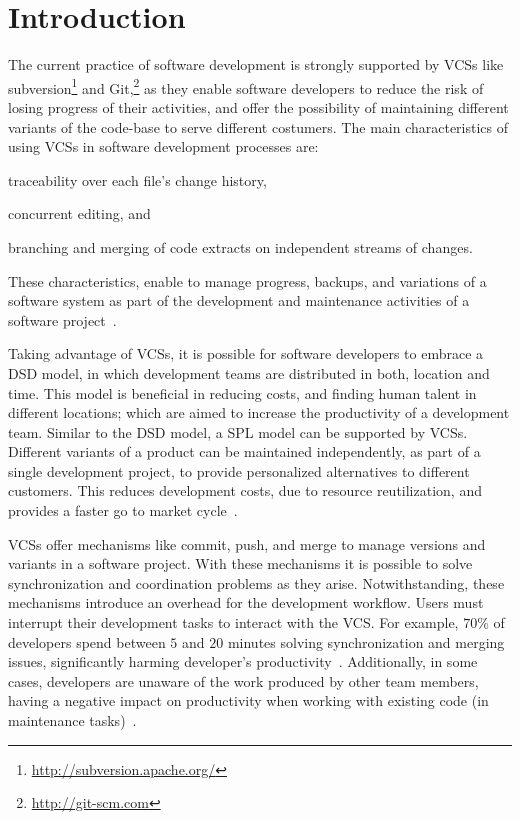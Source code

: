 
\section{Introduction}
\label{sec:introduction}

The current practice of software development is strongly supported by \acp{VCS} like 
subversion\footnote{\url{http://subversion.apache.org/}} and Git,\footnote{\url{http://git-scm.com}} as 
they enable software developers to reduce the risk of losing progress of their activities, and offer the 
possibility of maintaining different variants of the code-base to serve different costumers.
The main characteristics of using \acp{VCS} in software development processes are:
\begin{enumerate*}[label=(\arabic*)]
\item traceability over each file's change history, 
\item concurrent editing, and 
\item branching and merging of code extracts on independent streams of changes. 
\end{enumerate*}
These characteristics, enable to manage progress, backups, and variations of a software system as 
part of the development and maintenance activities of a software project~\cite{spinellis05}.

Taking advantage of \acp{VCS},  it is possible for software developers to embrace a \ac{DSD} model, in 
which development teams are distributed in both, location and time. This model is beneficial in reducing 
costs, and finding human talent in different locations; which are aimed to increase the productivity of a 
development team. 
Similar to the \ac{DSD} model, a \ac{SPL} model can be supported by \acp{VCS}. Different variants of a 
product can be maintained independently, as part of a single development project, to provide 
personalized alternatives to different customers. This reduces development costs, due to resource 
reutilization, and provides a faster go to market cycle~\cite{pohl05}.  

\acp{VCS} offer mechanisms like commit, push, and merge to manage versions and variants in a 
software project. With these mechanisms it is possible to solve synchronization and coordination 
problems as they arise. 
Notwithstanding, these mechanisms introduce an overhead for the development workflow. Users must interrupt their development tasks to interact with the \ac{VCS}. For example, $70\%$ of developers spend between $5$ and  $20$ minutes solving synchronization and merging issues, significantly harming developer's productivity~\cite{estler14}. Additionally, in some cases, developers are unaware of the work produced by other team members, having a negative impact on productivity when working with existing code (\eg in maintenance tasks)~\cite{dourish92}.


